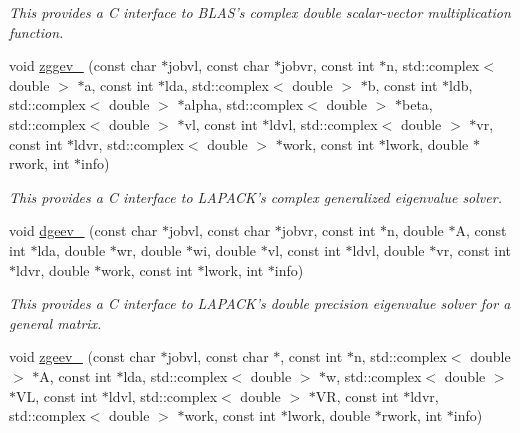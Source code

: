 \begin{DoxyCompactItemize}
\begin{DoxyCompactList}\small\item\em This provides a C interface to B\-L\-A\-S's complex double scalar-\/vector multiplication function. \end{DoxyCompactList}\item 
\hypertarget{namespacekeycpp_ace2501951ab3db3a91c3520ae89750b1}{void \hyperlink{namespacekeycpp_ace2501951ab3db3a91c3520ae89750b1}{zggev\-\_\-} (const char $\ast$jobvl, const char $\ast$jobvr, const int $\ast$n, std\-::complex$<$ double $>$ $\ast$a, const int $\ast$lda, std\-::complex$<$ double $>$ $\ast$b, const int $\ast$ldb, std\-::complex$<$ double $>$ $\ast$alpha, std\-::complex$<$ double $>$ $\ast$beta, std\-::complex$<$ double $>$ $\ast$vl, const int $\ast$ldvl, std\-::complex$<$ double $>$ $\ast$vr, const int $\ast$ldvr, std\-::complex$<$ double $>$ $\ast$work, const int $\ast$lwork, double $\ast$rwork, int $\ast$info)}\label{namespacekeycpp_ace2501951ab3db3a91c3520ae89750b1}

\begin{DoxyCompactList}\small\item\em This provides a C interface to L\-A\-P\-A\-C\-K's complex generalized eigenvalue solver. \end{DoxyCompactList}\item 
\hypertarget{namespacekeycpp_aebc5253e80ac15a9bfdc5449ae4f972a}{void \hyperlink{namespacekeycpp_aebc5253e80ac15a9bfdc5449ae4f972a}{dgeev\-\_\-} (const char $\ast$jobvl, const char $\ast$jobvr, const int $\ast$n, double $\ast$A, const int $\ast$lda, double $\ast$wr, double $\ast$wi, double $\ast$vl, const int $\ast$ldvl, double $\ast$vr, const int $\ast$ldvr, double $\ast$work, const int $\ast$lwork, int $\ast$info)}\label{namespacekeycpp_aebc5253e80ac15a9bfdc5449ae4f972a}

\begin{DoxyCompactList}\small\item\em This provides a C interface to L\-A\-P\-A\-C\-K's double precision eigenvalue solver for a general matrix. \end{DoxyCompactList}\item 
\hypertarget{namespacekeycpp_a8c1cca2a162f40fc6c6218c35cadf9f2}{void \hyperlink{namespacekeycpp_a8c1cca2a162f40fc6c6218c35cadf9f2}{zgeev\-\_\-} (const char $\ast$jobvl, const char $\ast$, const int $\ast$n, std\-::complex$<$ double $>$ $\ast$A, const int $\ast$lda, std\-::complex$<$ double $>$ $\ast$w, std\-::complex$<$ double $>$ $\ast$V\-L, const int $\ast$ldvl, std\-::complex$<$ double $>$ $\ast$V\-R, const int $\ast$ldvr, std\-::complex$<$ double $>$ $\ast$work, const int $\ast$lwork, double $\ast$rwork, int $\ast$info)}\label{namespacekeycpp_a8c1cca2a162f40fc6c6218c35cadf9f2}


\end{DoxyCompactItemize}
